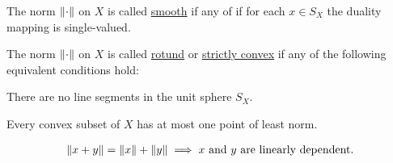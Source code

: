 \begin{definition}\label{def:smooth_norm}\cite[Definition 2.36]{Phelps1993}
  The norm $\left\Vert \cdot \right\Vert$ on $X$ is called \ul{smooth} if any of  if for each $x \in S_X$ the duality mapping is single-valued.
\end{definition}

\begin{definition}\label{def:rotund_norm}\cite[Definition 2.36]{Phelps1993}
  The norm $\left\Vert \cdot \right\Vert$ on $X$ is called \ul{rotund} or \ul{strictly convex} if any of the following equivalent conditions hold:
  \begin{defenum}
    \item\label{def:rotund_norm/no_sphere_segments} There are no line segments in the unit sphere $S_X$.
    \item\label{def:rotund_norm/least_norm} Every convex subset of $X$ has at most one point of least norm.
    \item\label{def:rotund_norm/linearly_dependent}
    \begin{align}\label{def:rotund_norm/linearly_dependent/equation}
      \left\Vert x + y \right\Vert = \left\Vert x \right\Vert + \left\Vert y \right\Vert \implies x \text{ and } y \text{ are linearly dependent}.
    \end{align}
  \end{defenum}
\end{definition}
